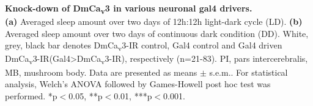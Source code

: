 \label{fig:S4}
\textbf{Knock-down of DmCa\textsubscript{v}3 in various neuronal gal4 drivers.}
\\
\textbf {(a)} Averaged sleep amount over two days of 12h:12h light-dark cycle (LD).
\textbf {(b)} Averaged sleep amount over two days of continuous dark condition (DD).
White, grey, black bar denotes DmCa\textsubscript{v}3-IR control, Gal4 control and Gal4 driven DmCa\textsubscript{v}3-IR(Gal4\textgreater{}DmCa\textsubscript{v}3-IR), respectively (n=21-83).
PI, pars intercerebralis, MB, mushroom body. 
Data are presented as means $\pm$ s.e.m..
For statistical analysis, Welch's ANOVA followed by Games-Howell post hoc test was performed.
*p$<$0.05, **p$<$0.01, ***p$<$0.001.
  
  
  
  
  
  